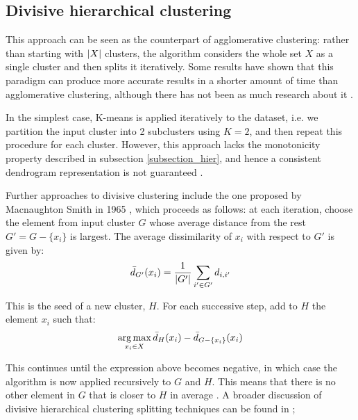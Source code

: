 \documentclass[../main.tex]{subfiles} \label{chapter_soa}
\begin{document}
\subsection{Divisive hierarchical clustering} \label{subsection_divisive}
This approach can be seen as the counterpart of agglomerative clustering: rather than starting with $\lvert X\rvert$ clusters, the algorithm considers the whole set $X$ as a single cluster and then splits it iteratively. Some results have shown that this paradigm can produce more accurate results in a shorter amount of time than agglomerative clustering, although there has not been as much research about it \cite{Manning2009}.  
\par In the simplest case, K-means is applied iteratively to the dataset, i.e. we partition the input cluster into 2 subclusters using $K=2$, and then repeat this procedure for each cluster. However, this approach lacks the monotonicity property described in subsection \ref{subsection_hier}, and hence a consistent dendrogram representation is not guaranteed \cite{hastie2008}.
\par Further approaches to divisive clustering include the one proposed by Macnaughton Smith in 1965 \cite{hastie2008}, which proceeds as follows: at each iteration, choose the element from input cluster $G$ whose average distance from the rest $G' = G - \{x_i\}$ is largest. The average dissimilarity of $x_i$ with respect to $G'$ is given by:
\begin{align*}
\bar{d}_{G'}(x_i) = \frac{1}{\lvert G'\rvert}\sum_{i'\in G'} d_{i,i'}
\end{align*}
\par This is the seed of a new cluster, $H$. For each successive step, add to $H$ the element $x_i$ such that:
\begin{align*}
\operatorname*{arg\,max}_{x_i \in X} \bar{d}_H(x_i) - \bar{d}_{G-\{x_i\}}(x_i)
\end{align*}
\par This continues until the expression above becomes negative, in which case the algorithm is now applied recursively to $G$ and $H$. This means that there is no other element in $G$ that is closer to $H$ in average \cite{hastie2008}. A broader discussion of divisive hierarchical clustering splitting techniques can be found in \cite{.2006};
\end{document}
